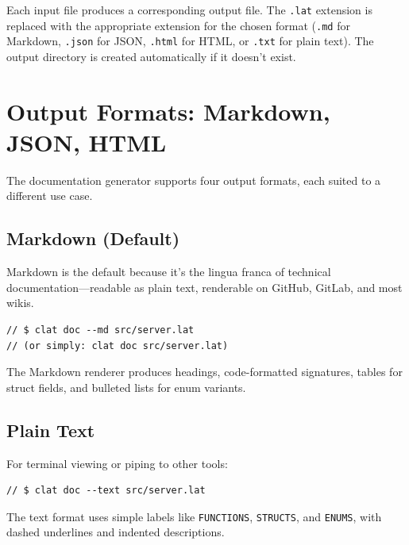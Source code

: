 Each input file produces a corresponding output file.
The \lstinline|.lat| extension is replaced with the appropriate extension for the chosen format (\lstinline|.md| for Markdown, \lstinline|.json| for JSON, \lstinline|.html| for HTML, or \lstinline|.txt| for plain text).
The output directory is created automatically if it doesn't exist.

\section{Output Formats: Markdown, JSON, HTML}\label{sec:doc-formats}

The documentation generator supports four output formats, each suited to a different use case.

\subsection{Markdown (Default)}\label{sec:doc-markdown}

Markdown is the default because it's the lingua franca of technical documentation---readable as plain text, renderable on GitHub, GitLab, and most wikis.

\begin{lstlisting}[language=Lattice, caption={Generating Markdown output}]
// $ clat doc --md src/server.lat
// (or simply: clat doc src/server.lat)
\end{lstlisting}

The Markdown renderer produces headings, code-formatted signatures, tables for struct fields, and bulleted lists for enum variants.

\subsection{Plain Text}\label{sec:doc-text}

For terminal viewing or piping to other tools:

\begin{lstlisting}[language=Lattice, caption={Generating plain text output}]
// $ clat doc --text src/server.lat
\end{lstlisting}

The text format uses simple labels like \texttt{FUNCTIONS}, \texttt{STRUCTS}, and \texttt{ENUMS}, with dashed underlines and indented descriptions.

